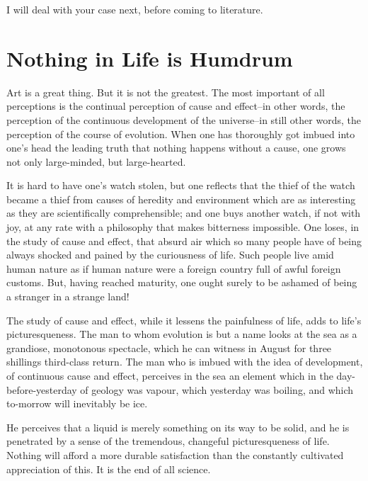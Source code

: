 I will deal with your case next, before coming to literature.



\addtocounter{chapter}{1}\chapter*{Nothing in Life is Humdrum}

Art is a great thing.  But it is not the greatest.  The most important
of all perceptions is the continual perception of cause and effect--in
other words, the perception of the continuous development of the
universe--in still other words, the perception of the course of
evolution.  When one has thoroughly got imbued into one's head the
leading truth that nothing happens without a cause, one grows not only
large-minded, but large-hearted.

It is hard to have one's watch stolen, but one reflects that the thief
of the watch became a thief from causes of heredity and environment
which are as interesting as they are scientifically comprehensible; and
one buys another watch, if not with joy, at any rate with a philosophy
that makes bitterness impossible.  One loses, in the study of cause and
effect, that absurd air which so many people have of being always
shocked and pained by the curiousness of life.  Such people live amid
human nature as if human nature were a foreign country full of awful
foreign customs. But, having reached maturity, one ought surely to be
ashamed of being a stranger in a strange land!

The study of cause and effect, while it lessens the painfulness of
life, adds to life's picturesqueness.  The man to whom evolution is but
a name looks at the sea as a grandiose, monotonous spectacle, which he
can witness in August for three shillings third-class return.  The man
who is imbued with the idea of development, of continuous cause and
effect, perceives in the sea an element which in the
day-before-yesterday of geology was vapour, which yesterday was
boiling, and which to-morrow will inevitably be ice.

He perceives that a liquid is merely something on its way to be solid,
and he is penetrated by a sense of the tremendous, changeful
picturesqueness of life.  Nothing will afford a more durable
satisfaction than the constantly cultivated appreciation of this. It is
the end of all science.


